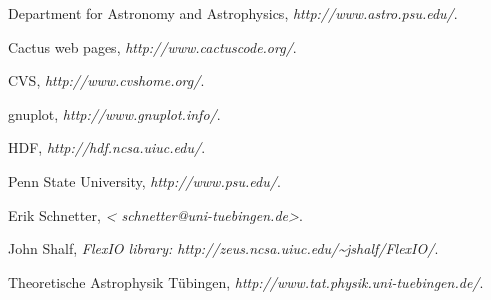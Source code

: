 
\providecommand{\bysame}{\leavevmode\hbox to3em{\hrulefill}\thinspace}
\providecommand{\MR}{\relax\ifhmode\unskip\space\fi MR }
\providecommand{\MRhref}[2]{%
  \href{http://www.ams.org/mathscinet-getitem?mr=#1}{#2} }
\providecommand{\href}[2]{#2}
\begin{thebibliography}{{Pen}}

{Department for} Astronomy and Astrophysics,
  \emph{\href{http://www.astro.psu.edu/} {http://www.astro.psu.edu/}}.

{Cactus web pages}, \emph{\href{http://www.cactuscode.org/}
  {http://www.cactuscode.org/}}.

CVS, \emph{\href{http://www.cvshome.org/} {http://www.cvshome.org/}}.

gnuplot, \emph{\href{http://www.gnuplot.info/} {http://www.gnuplot.info/}}.

HDF, \emph{\href{http://hdf.ncsa.uiuc.edu/} {http://hdf.ncsa.uiuc.edu/}}.

{Penn State University}, \emph{\href{http://www.psu.edu/}
  {http://www.psu.edu/}}.

Erik Schnetter, \emph{\href{mailto:schnetter@uni-tuebingen.de} {\textless
  schnetter@uni-tuebingen.de\textgreater}}.

John Shalf, \emph{{FlexIO} library:
  \href{http://zeus.ncsa.uiuc.edu/~jshalf/FlexIO/}
  {http://zeus.ncsa.uiuc.edu/\textasciitilde jshalf/FlexIO/}}.

Theoretische Astrophysik T\"ubingen,
  \emph{\href{http://www.tat.physik.uni-tuebingen.de/} {http://www.tat.physik.uni-tuebingen.de/}}.

\end{thebibliography}




